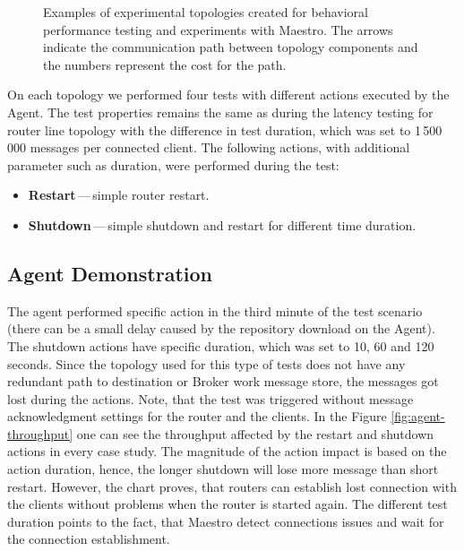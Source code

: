 \begin{figure}[h]
\begin{minipage}{0.45\linewidth}
	\end{minipage}
	\caption[Examples of experimental topologies created for behavioral performance testing and experiments with Maestro.]{Examples of experimental topologies created for behavioral performance testing and experiments with Maestro. The arrows indicate the communication path between topology components and the numbers represent the cost for the path.}\label{fig:agent_topologies}
\end{figure}

On each topology we performed four tests with different actions executed by the Agent. The test properties remains the same as during the latency testing for router line topology with the difference in test duration, which was set to 1\,500\,000 messages per connected client. The following actions, with additional parameter such as duration, were performed during the test:

\begin{itemize}
	\setlength\itemsep{0em}
	\item \textbf{Restart}\,---\,simple router restart.
	\item \textbf{Shutdown}\,---\,simple shutdown and restart for different time duration.
\end{itemize}

\subsection{Agent Demonstration}
\label{Agent Demonstration}
The agent performed specific action in the third minute of the test scenario (there can be a small delay caused by the repository download on the Agent). The shutdown actions have specific duration, which was set to 10, 60 and 120 seconds. Since the topology used for this type of tests does not have any redundant path to destination or Broker work message store, the messages got lost during the actions. Note, that the test was triggered without message acknowledgment settings for the router and the clients. In the Figure \ref{fig:agent-throughput} one can see the throughput affected by the restart and shutdown actions in every case study. The magnitude of the action impact is based on the action duration, hence, the longer shutdown will lose more message than short restart. However, the chart proves, that routers can establish lost connection with the clients without problems when the router is started again. The different test duration points to the fact, that Maestro detect connections issues and wait for the connection establishment.

